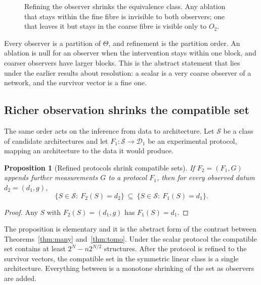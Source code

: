 \documentclass[11pt]{article}
\newtheorem{proposition}[theorem]{Proposition}
\theoremstyle{definition}
\theoremstyle{remark}
\begin{document}
\begin{figure}[ht]
\centering
{}
\caption{Refining the observer shrinks the equivalence class. Any ablation that stays within the fine fibre is invisible to both observers; one that leaves it but stays in the coarse fibre is visible only to $O_2$.}
\end{figure}

Every observer is a partition of $\Theta$, and refinement is the partition order. An ablation is null for an observer when the intervention stays within one block, and coarser observers have larger blocks. This is the abstract statement that lies under the earlier results about resolution: a scalar is a very coarse observer of a network, and the survivor vector is a fine one.

\subsection{Richer observation shrinks the compatible set}

The same order acts on the inference from data to architecture. Let $\mathcal S$ be a class of candidate architectures and let $F_1:\mathcal S\to\mathcal D_1$ be an experimental protocol, mapping an architecture to the data it would produce.

\begin{proposition}[Refined protocols shrink compatible sets]\label{prop:shrink}
If $F_2=(F_1,G)$ appends further measurements $G$ to a protocol $F_1$, then for every observed datum $d_2=(d_1,g)$,
\[
\{S\in\mathcal S:\ F_2(S)=d_2\}\ \subseteq\ \{S\in\mathcal S:\ F_1(S)=d_1\}.
\]
\end{proposition}
\begin{proof}
Any $S$ with $F_2(S)=(d_1,g)$ has $F_1(S)=d_1$.
\end{proof}

The proposition is elementary and it is the abstract form of the contrast between Theorems~\ref{thm:many} and~\ref{thm:tomo}. Under the scalar protocol the compatible set contains at least $2^N-n2^{N/2}$ structures. After the protocol is refined to the survivor vectors, the compatible set in the symmetric linear class is a single architecture. Everything between is a monotone shrinking of the set as observers are added.
\end{document}

